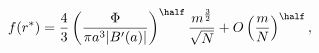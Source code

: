 \begin{equation}
\label{Eq_A08}
f(r^{*})
  = \frac{4}{3} \left(\frac{\Phi}{\pi a^3 |B'(a)|}\right)^{\half}
    \frac{m^{\frac{3}{2}}}{\sqrt{N}} + O\left(\frac{m}{N}\right)^{\half},
\end{equation}

